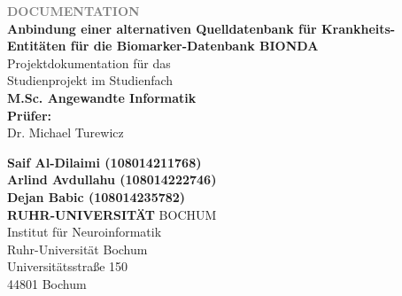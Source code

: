 \begin{titlepage}
  \thispagestyle{titlepage}
  \begin{center}
    \vspace*{4cm}
    {\Huge \textbf{ \textcolor{Gray}{ \uppercase{ Documentation }}}}
    \\
    \vspace*{1cm}
    {\Large \textbf{ \textcolor{rubblue}{Anbindung einer alternativen Quelldatenbank für Krankheits-Entitäten für die Biomarker-Datenbank BIONDA}}}
    \\
    \vspace*{2cm}
    Projektdokumentation für das \\
    Studienprojekt im Studienfach\\
    \textbf{    M.Sc. Angewandte Informatik}\\
    \vspace*{1cm}
    \textbf{Prüfer:} \\
    Dr. Michael Turewicz
  \end{center}
  \vfill
  \begin{flushright}
    \textbf{Saif Al-Dilaimi (108014211768)} \\
    \textbf{Arlind Avdullahu (108014222746)} \\
    \textbf{Dejan Babic (108014235782)} \\
    \textcolor{rubblue}{\textbf{RUHR-UNIVERSITÄT} BOCHUM} \\
    Institut für Neuroinformatik \\
    Ruhr-Universität Bochum \\
    Universitätsstraße 150 \\
    44801 Bochum
  \end{flushright}
\end{titlepage}